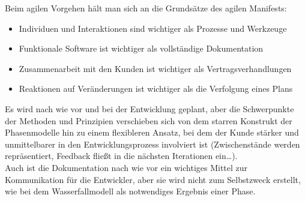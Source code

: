 Beim agilen Vorgehen hält man sich an die Grundsätze des agilen Manifests:

\begin{itemize}
    \item Individuen und Interaktionen sind wichtiger als Prozesse und Werkzeuge
    \item Funktionale Software ist wichtiger als vollständige Dokumentation
    \item Zusammenarbeit mit den Kunden ist wichtiger als Vertragsverhandlungen
    \item Reaktionen auf Veränderungen ist wichtiger als die Verfolgung eines Plans
\end{itemize}

\noindent
Es wird nach wie vor und bei der Entwicklung geplant, aber die Schwerpunkte der Methoden und Prinzipien verschieben sich von dem starren Konstrukt der Phasenmodelle hin zu einem flexibleren Ansatz, bei dem der Kunde stärker und unmittelbarer in den Entwicklungsprozess involviert ist (Zwischenstände werden repräsentiert, Feedback fließt in die nächsten Iterationen ein\ldots).\\
Auch ist die Dokumentation nach wie vor ein wichtiges Mittel zur Kommunikation für die Entwickler, aber sie wird nicht zum Selbstzweck erstellt, wie bei dem Wasserfallmodell als notwendiges Ergebnis einer Phase.